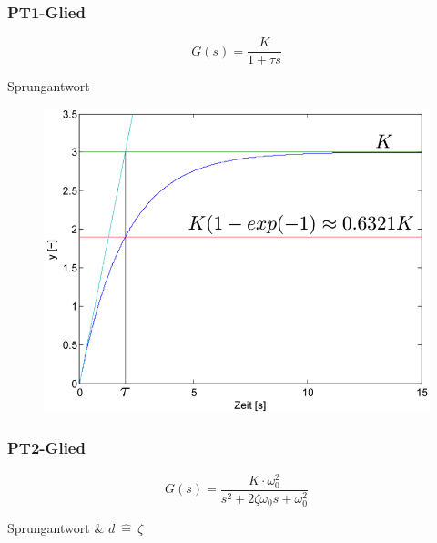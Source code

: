 \documentclass[
  10pt,
  a4paper,
  twocolumn]{article}
\numberwithin{equation}{section}
\begin{document}
\hypertarget{pt1-glied}{%
\subsubsection{PT1-Glied}\label{pt1-glied}}

\[
G(s)=\frac{K}{1+\tau s}
\]

Sprungantwort

\begin{figure}[H]

{\centering \includegraphics{images/paste-20.png}

}

\end{figure}

\hypertarget{pt2-glied}{%
\subsubsection{PT2-Glied}\label{pt2-glied}}

\[
G(s)=\frac{K\cdot \omega_0^2}{s^2+2\zeta\omega_0 s+\omega_0^2}
\]

Sprungantwort \& \(d\ \hat{=}\ \zeta\)
\end{document}

